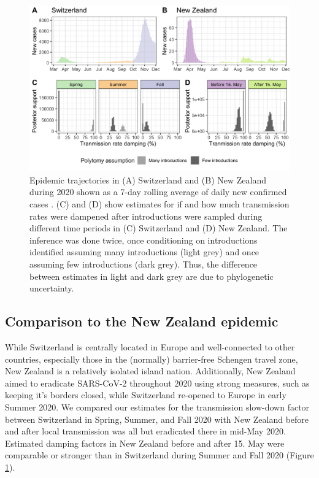 \documentclass[9pt,twoside,lineno]{pnas-new} %
\begin{document}
\begin{figure}[h!]
\centering
\includegraphics[width=0.75\linewidth]{figures/contact_tracing_factors_no_sampUB_compared_to_cases.png}
\caption{Epidemic trajectories in (A) Switzerland and (B) New Zealand during 2020 shown as a 7-day rolling average of daily new confirmed cases \cite{Appel}. (C) and (D) show estimates for if and how much transmission rates were dampened after introductions were sampled during different time periods in (C) Switzerland and (D) New Zealand. The inference was done twice, once conditioning on introductions identified assuming many introductions (light grey) and once assuming few introductions (dark grey). Thus, the difference between estimates in light and dark grey are due to phylogenetic uncertainty.}  
\label{fig:scale-factor}
\end{figure}

\subsection{Comparison to the New Zealand epidemic}
While Switzerland is centrally located in Europe and well-connected to other countries, especially those in the (normally) barrier-free Schengen travel zone, New Zealand is a relatively isolated island nation. Additionally, New Zealand aimed to eradicate SARS-CoV-2 throughout 2020 using strong measures, such as keeping it's borders closed, while Switzerland re-opened to Europe in early Summer 2020. We compared our estimates for the transmission slow-down factor between Switzerland in Spring, Summer, and Fall 2020 with New Zealand before and after local transmission was all but eradicated there in mid-May 2020. Estimated damping factors in New Zealand before and after 15. May were comparable or stronger than in Switzerland during Summer and Fall 2020 (Figure \ref{fig:scale-factor}).
\end{document}
